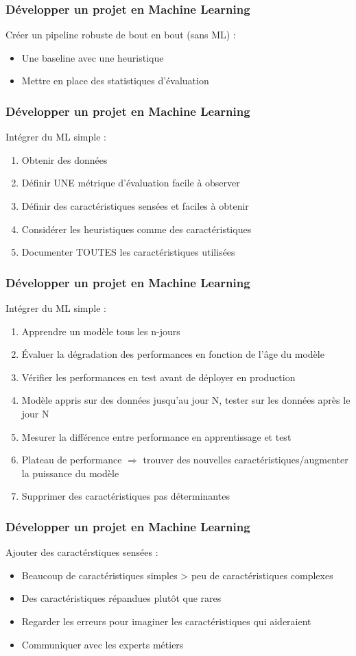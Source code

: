 \documentclass{formation}
\begin{document}
\begin{frame}
  \frametitle{Développer un projet en Machine Learning}
  Créer un pipeline robuste de bout en bout (sans ML) :
  \begin{itemize}
  \item Une baseline avec une heuristique
  \item Mettre en place des statistiques d'évaluation
  \end{itemize}
\end{frame}

\begin{frame}
  \frametitle{Développer un projet en Machine Learning}
  Intégrer du ML simple :
  \begin{enumerate}
  \item Obtenir des données
  \item Définir UNE métrique d'évaluation facile à observer
  \item Définir des caractéristiques sensées et faciles à obtenir
  \item Considérer les heuristiques comme des caractéristiques
  \item Documenter TOUTES les caractéristiques utilisées
  \end{enumerate}
\end{frame}

\begin{frame}
  \frametitle{Développer un projet en Machine Learning}
  Intégrer du ML simple :
  \begin{enumerate}\addtocounter{enumi}{5}
  \item Apprendre un modèle tous les n-jours
  \item Évaluer la dégradation des performances en fonction de l'âge du modèle
  \item Vérifier les performances en test avant de déployer en production
  \item Modèle appris sur des données jusqu'au jour N, tester sur les données après le jour N
  \item Mesurer la différence entre performance en apprentissage et test
  \item Plateau de performance $\Rightarrow$ trouver des nouvelles caractéristiques/augmenter la puissance du modèle
  \item Supprimer des caractéristiques pas déterminantes
  \end{enumerate}
\end{frame}

\begin{frame}
  \frametitle{Développer un projet en Machine Learning}
  Ajouter des caractérstiques sensées :
  \begin{itemize}
  \item Beaucoup de caractéristiques simples > peu de caractéristiques complexes
  \item Des caractéristiques répandues plutôt que rares
  \item Regarder les erreurs pour imaginer les caractéristiques qui aideraient
  \item Communiquer avec les experts métiers
  \end{itemize}
\end{frame}
\end{document}
